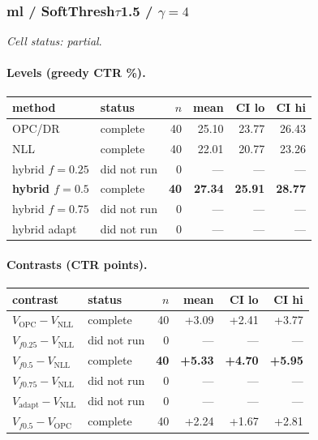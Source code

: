 \documentclass[10pt,a4paper]{article}
\begin{document}
\subsubsection{ml / SoftThresh$\tau$1.5 / $\gamma=4$}
\emph{Cell status: partial}.
\paragraph{Levels (greedy CTR \%).}
{\centering\small\begin{tabular}{llrrrr}
\toprule method & status & $n$ & mean & CI lo & CI hi \\
\midrule
OPC/DR & complete & 40 & 25.10 & 23.77 & 26.43 \\
NLL & complete & 40 & 22.01 & 20.77 & 23.26 \\
hybrid $f{=}0.25$ & did not run & 0 & --- & --- & --- \\
\textbf{hybrid $f{=}0.5$} & complete & \textbf{40} & \textbf{27.34} & \textbf{25.91} & \textbf{28.77} \\
hybrid $f{=}0.75$ & did not run & 0 & --- & --- & --- \\
hybrid adapt & did not run & 0 & --- & --- & --- \\
\bottomrule\end{tabular}\par}
\paragraph{Contrasts (CTR points).}
{\centering\small\begin{tabular}{llrrrr}
\toprule contrast & status & $n$ & mean & CI lo & CI hi \\
\midrule
$V_{\mathrm{OPC}}-V_{\mathrm{NLL}}$ & complete & 40 & +3.09 & +2.41 & +3.77 \\
$V_{f0.25}-V_{\mathrm{NLL}}$ & did not run & 0 & --- & --- & --- \\
\textbf{$V_{f0.5}-V_{\mathrm{NLL}}$} & complete & \textbf{40} & \textbf{+5.33} & \textbf{+4.70} & \textbf{+5.95} \\
$V_{f0.75}-V_{\mathrm{NLL}}$ & did not run & 0 & --- & --- & --- \\
$V_{\mathrm{adapt}}-V_{\mathrm{NLL}}$ & did not run & 0 & --- & --- & --- \\
$V_{f0.5}-V_{\mathrm{OPC}}$ & complete & 40 & +2.24 & +1.67 & +2.81 \\
\bottomrule\end{tabular}\par}
\end{document}
